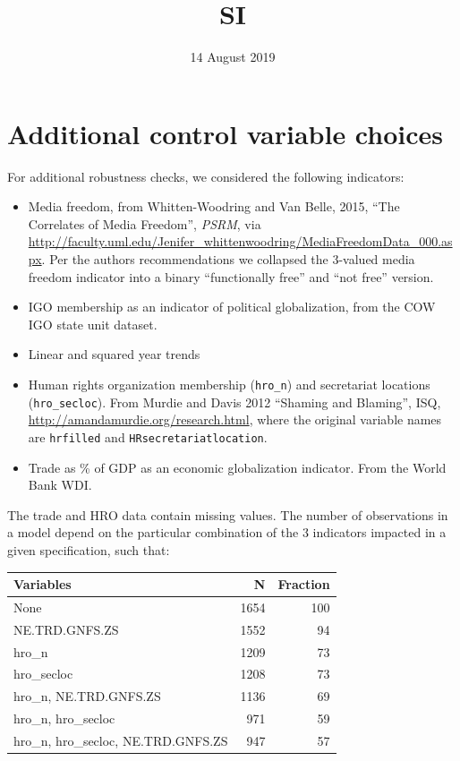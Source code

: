 \documentclass[]{article}
\title{SI}
\author{}
\date{14 August 2019}
\providecommand{\tightlist}{%
  \setlength{\itemsep}{0pt}\setlength{\parskip}{0pt}}
\begin{document}
\maketitle

{
\setcounter{tocdepth}{2}
\tableofcontents
}
\hypertarget{additional-control-variable-choices}{%
\section{Additional control variable
choices}\label{additional-control-variable-choices}}

For additional robustness checks, we considered the following
indicators:

\begin{itemize}
\tightlist
\item
  Media freedom, from Whitten-Woodring and Van Belle, 2015, ``The
  Correlates of Media Freedom'', \emph{PSRM}, via
  \url{http://faculty.uml.edu/Jenifer_whittenwoodring/MediaFreedomData_000.aspx}.
  Per the authors recommendations we collapsed the 3-valued media
  freedom indicator into a binary ``functionally free'' and ``not free''
  version.
\item
  IGO membership as an indicator of political globalization, from the
  COW IGO state unit dataset.
\item
  Linear and squared year trends
\item
  Human rights organization membership (\texttt{hro\_n}) and secretariat
  locations (\texttt{hro\_secloc}). From Murdie and Davis 2012 ``Shaming
  and Blaming'', ISQ, \url{http://amandamurdie.org/research.html}, where
  the original variable names are \texttt{hrfilled} and
  \texttt{HRsecretariatlocation}.
\item
  Trade as \% of GDP as an economic globalization indicator. From the
  World Bank WDI.
\end{itemize}

The trade and HRO data contain missing values. The number of
observations in a model depend on the particular combination of the 3
indicators impacted in a given specification, such that:

\begin{table}[H]
\centering
\begin{tabular}{lrr}
\toprule
Variables & N & Fraction\\
\midrule
None & 1654 & 100\\
NE.TRD.GNFS.ZS & 1552 & 94\\
hro\_n & 1209 & 73\\
hro\_secloc & 1208 & 73\\
hro\_n, NE.TRD.GNFS.ZS & 1136 & 69\\
\addlinespace
hro\_n, hro\_secloc & 971 & 59\\
hro\_n, hro\_secloc, NE.TRD.GNFS.ZS & 947 & 57\\
\bottomrule
\end{tabular}
\end{table}
\end{document}
